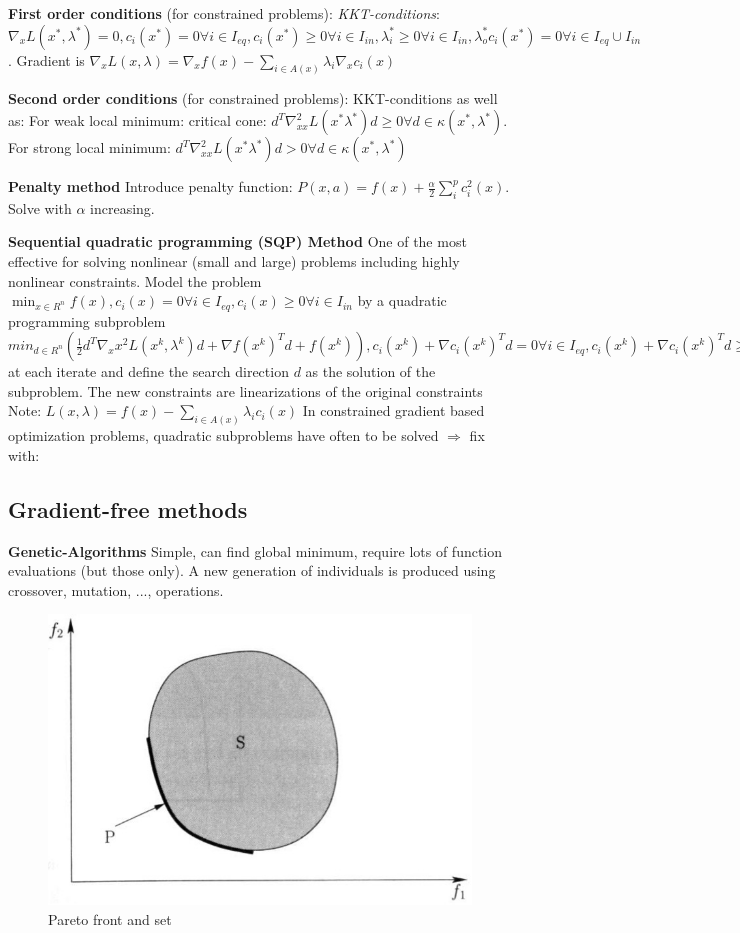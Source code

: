 \textbf{First order conditions} (for constrained problems): \textit{KKT-conditions}: $\nabla_x L(x^*, \lambda^*) = 0, c_i(x^*) = 0 \forall i \in I_{eq}, c_i (x^*) \geq 0 \forall i \in I_{in}, \lambda_i^* \geq 0 \forall i \in I_{in}, \lambda_o^* c_i (x^*) = 0 \forall i \in I_{eq} \cup I_{in}$. Gradient is $\nabla_x L (x, \lambda) = \nabla_x f(x) - \sum_{i\in A(x)} \lambda_i \nabla_x c_i (x)$

\textbf{Second order conditions} (for constrained problems): KKT-conditions as well as:
For weak local minimum: critical cone: $d^T \nabla_{xx}^2 L(x^* \lambda^*)d \geq 0 \forall d \in \kappa(x^*, \lambda^*)$.  
For strong local minimum: $d^T \nabla_{xx}^2 L(x^* \lambda^*)d > 0 \forall d \in \kappa(x^*, \lambda^*)$

\textbf{Penalty method}
Introduce penalty function: $P(x,a) = f(x) + \frac{\alpha}{2} \sum_i^p c_i^2 (x)$. Solve with $\alpha$ increasing.

\textbf{Sequential quadratic programming (SQP) Method}
One of the most effective for solving nonlinear (small and large) problems including highly nonlinear constraints.
Model the problem $\min_{x\in R^n} f(x), c_i (x) = 0 \forall i \in I_{eq}, c_i (x) \geq 0 \forall i \in I_{in}$ by a quadratic programming subproblem $min_{d \in R^n} (\frac{1}{2} d^T \nabla_xx^2 L (x^k, \lambda^k) d + \nabla f (x^k)^T d + f(x^k)), c_i (x^k) + \nabla c_i (x^k)^T d = 0 \forall i \in I_{eq}, c_i (x^k) + \nabla c_i (x^k)^T d \geq 0 \forall i \in I_{in}$ at each iterate and define the search direction $d$ as the solution of the subproblem.
The new constraints are linearizations of the original constraints
Note: $L(x,\lambda) = f(x) - \sum_{i\in A(x)}\lambda_i c_i (x)$
In constrained gradient based optimization problems, quadratic subproblems have often to be solved $\Rightarrow$ fix with:

\subsection*{Gradient-free methods}
\textbf{Genetic-Algorithms}
Simple, can find global minimum, require lots of function evaluations (but those only). A new generation of individuals is produced using crossover, mutation, ..., operations.

\begin{figure}[H]
    \vspace{-0.5cm}
    \centering
    \includegraphics[width=0.4\linewidth]{img/pareto.jpg}
    \caption{\label{fig:pareto}Pareto front and set}
\end{figure}
\vspace{-0.5cm}

